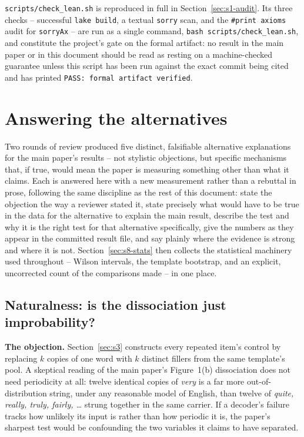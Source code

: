\documentclass[11pt]{article}
\begin{document}
\texttt{scripts/check\_lean.sh} is reproduced in full in
Section~\ref{sec:s1-audit}. Its three checks -- successful \texttt{lake
build}, a textual \texttt{sorry} scan, and the \texttt{\#print axioms} audit
for \texttt{sorryAx} -- are run as a single command,
\texttt{bash scripts/check\_lean.sh}, and constitute the project's gate on
the formal artifact: no result in the main paper or in this document should
be read as resting on a machine-checked guarantee unless this script has
been run against the exact commit being cited and has printed
\texttt{PASS: formal artifact verified}.

\section{Answering the alternatives}
\label{sec:s8}

Two rounds of review produced five distinct, falsifiable alternative
explanations for the main paper's results -- not stylistic objections, but
specific mechanisms that, if true, would mean the paper is measuring
something other than what it claims. Each is answered here with a new
measurement rather than a rebuttal in prose, following the same discipline as
the rest of this document: state the objection the way a reviewer stated it,
state precisely what would have to be true in the data for the alternative to
explain the main result, describe the test and why it is the right test for
that alternative specifically, give the numbers as they appear in the
committed result file, and say plainly where the evidence is strong and where
it is not. Section~\ref{sec:s8-stats} then collects the statistical
machinery used throughout -- Wilson intervals, the template bootstrap, and an
explicit, uncorrected count of the comparisons made -- in one place.

\subsection{Naturalness: is the dissociation just improbability?}
\label{sec:s8-natural}

\textbf{The objection.} Section~\ref{sec:s3} constructs every repeated item's
control by replacing $k$ copies of one word with $k$ distinct fillers from the
same template's pool. A skeptical reading of the main paper's
Figure~1(b) dissociation does not need periodicity at all: twelve identical
copies of \emph{very} is a far more out-of-distribution string, under any
reasonable model of English, than twelve of \emph{quite, really, truly,
fairly, \dots} strung together in the same carrier. If a decoder's failure
tracks how unlikely its input is rather than how periodic it is, the paper's
sharpest test would be confounding the two variables it claims to have
separated.
\end{document}

